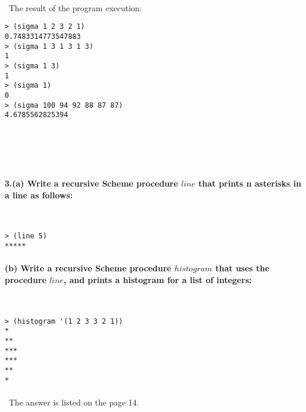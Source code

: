 \documentclass{article}
\begin{document}
\paragraph{}\	
\paragraph{}\
	The result of the program execution:
	
\begin{verbatim} 
> (sigma 1 2 3 2 1)
0.7483314773547883
> (sigma 1 3 1 3 1 3)
1
> (sigma 1 3)
1
> (sigma 1)
0
> (sigma 100 94 92 88 87 87)
4.6785562825394
\end{verbatim}
	
\paragraph{}\
\paragraph{}\

\paragraph{3.\quad (a) Write a recursive Scheme procedure \(line\) that prints n asterisks in a line as follows:}\

\begin{verbatim} 
> (line 5)
*****
\end{verbatim}

\paragraph{\qquad (b) Write a recursive Scheme procedure \(histogram\) that uses the procedure \(line\), and prints a histogram for a list of integers:}\

\begin{verbatim} 
> (histogram '(1 2 3 3 2 1))
*
**
***
***
**
*
\end{verbatim}
\paragraph{}\
		The answer is listed on the page 14.

\paragraph{}\
\end{document}
